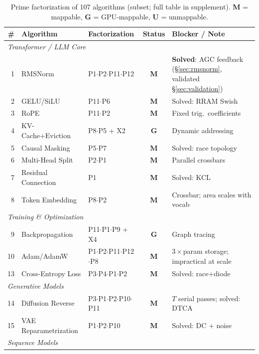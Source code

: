 \documentclass[11pt]{article}
\begin{document}
\begin{table}[t]
\centering
\caption{Prime factorization of 107 algorithms (subset; full table in supplement). \textbf{M} = mappable, \textbf{G} = GPU-mappable, \textbf{U} = unmappable.}
\label{tab:factorizations}
\footnotesize
\begin{tabular}{rllcl}
\toprule
\# & Algorithm & Factorization & Status & Blocker / Note \\
\midrule
\multicolumn{5}{l}{\textit{Transformer / LLM Core}} \\
1 & RMSNorm & P1$\cdot$P2$\cdot$P11$\cdot$P12 & \textbf{M} & \textbf{Solved}: AGC feedback (\S\ref{sec:rmsnorm}, validated \S\ref{sec:validation}) \\
2 & GELU/SiLU & P11$\cdot$P6 & \textbf{M} & Solved: RRAM Swish~\cite{rram_swish2022} \\
3 & RoPE & P11$\cdot$P2 & \textbf{M} & Fixed trig.\ coefficients \\
4 & KV-Cache+Eviction & P8$\cdot$P5 + X2 & \textbf{G} & Dynamic addressing \\
5 & Causal Masking & P5$\cdot$P7 & \textbf{M} & Solved: race topology~\cite{bieg2025} \\
6 & Multi-Head Split & P2$\cdot$P1 & \textbf{M} & Parallel crossbars \\
7 & Residual Connection & P1 & \textbf{M} & Solved: KCL~\cite{bieg2025} \\
8 & Token Embedding & P8$\cdot$P2 & \textbf{M} & Crossbar; area scales with vocab \\
\midrule
\multicolumn{5}{l}{\textit{Training \& Optimization}} \\
9 & Backpropagation & P11$\cdot$P1$\cdot$P9 + X4 & \textbf{G} & Graph tracing \\
10 & Adam/AdamW & P1$\cdot$P2$\cdot$P11$\cdot$P12$\cdot$P8 & \textbf{M} & $3\times$param storage; impractical at scale \\
13 & Cross-Entropy Loss & P3$\cdot$P4$\cdot$P1$\cdot$P2 & \textbf{M} & Solved: race+diode~\cite{bieg2025} \\
\midrule
\multicolumn{5}{l}{\textit{Generative Models}} \\
14 & Diffusion Reverse & P3$\cdot$P1$\cdot$P2$\cdot$P10$\cdot$P11 & \textbf{M} & $T$ serial passes; solved: DTCA~\cite{extropic2025} \\
15 & VAE Reparametrization & P1$\cdot$P2$\cdot$P10 & \textbf{M} & Solved: DC + noise~\cite{bieg2025} \\
\midrule
\multicolumn{5}{l}{\textit{Sequence Models}} \\

\end{tabular}
\end{table}
\end{document}
